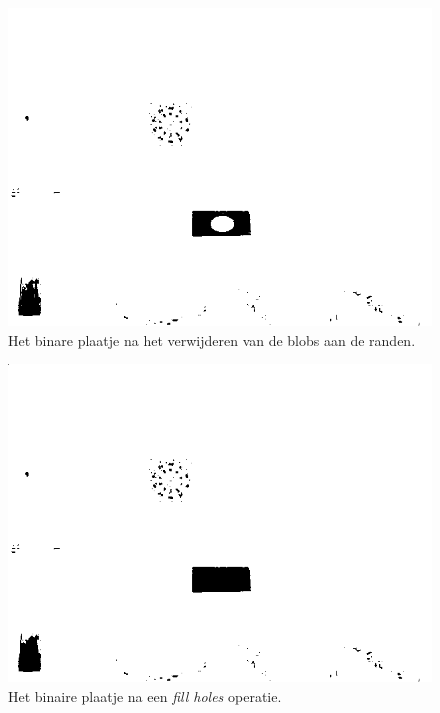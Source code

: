 \begin{figure}
    \begin{center}
        \includegraphics[scale=0.35]{figures/vision/borders.png}
    \end{center}
    \caption{Het binare plaatje na het verwijderen van de blobs aan de randen.}
    \label{fig:removeBorderBlobs}
\end{figure}

\begin{figure}
    \begin{center}
        \includegraphics[scale=0.35]{figures/vision/holes.png}
    \end{center}
    \caption{Het binaire plaatje na een \emph{fill holes} operatie.}
    \label{fig:fillHoles}
\end{figure}

